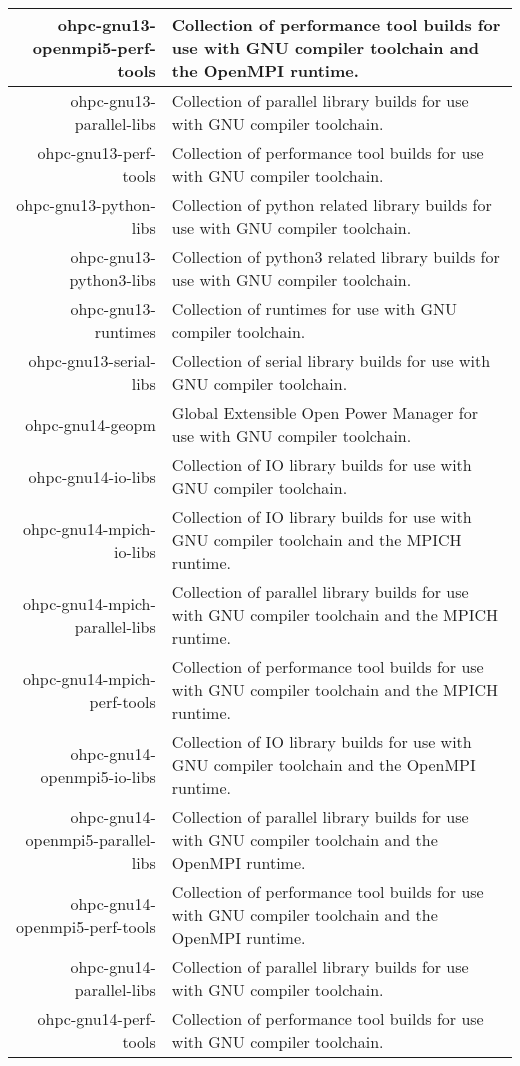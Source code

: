 \begin{tabularx}{\textwidth}{r|X}
\hline
ohpc-gnu13-openmpi5-perf-tools & Collection of performance tool builds for use with GNU compiler toolchain and the OpenMPI runtime. \\
\hline
ohpc-gnu13-parallel-libs & Collection of parallel library builds for use with GNU compiler toolchain. \\
\hline
ohpc-gnu13-perf-tools & Collection of performance tool builds for use with GNU compiler toolchain. \\
\hline
ohpc-gnu13-python-libs & Collection of python related library builds for use with GNU compiler toolchain. \\
\hline
ohpc-gnu13-python3-libs & Collection of python3 related library builds for use with GNU compiler toolchain. \\
\hline
ohpc-gnu13-runtimes & Collection of runtimes for use with GNU compiler toolchain. \\
\hline
ohpc-gnu13-serial-libs & Collection of serial library builds for use with GNU compiler toolchain. \\
\hline
ohpc-gnu14-geopm & Global Extensible Open Power Manager for use with GNU compiler toolchain. \\
\hline
ohpc-gnu14-io-libs & Collection of IO library builds for use with GNU compiler toolchain. \\
\hline
ohpc-gnu14-mpich-io-libs & Collection of IO library builds for use with GNU compiler toolchain and the MPICH runtime. \\
\hline
ohpc-gnu14-mpich-parallel-libs & Collection of parallel library builds for use with GNU compiler toolchain and the MPICH runtime. \\
\hline
ohpc-gnu14-mpich-perf-tools & Collection of performance tool builds for use with GNU compiler toolchain and the MPICH runtime. \\
\hline
ohpc-gnu14-openmpi5-io-libs & Collection of IO library builds for use with GNU compiler toolchain and the OpenMPI runtime. \\
\hline
ohpc-gnu14-openmpi5-parallel-libs & Collection of parallel library builds for use with GNU compiler toolchain and the OpenMPI runtime. \\
\hline
ohpc-gnu14-openmpi5-perf-tools & Collection of performance tool builds for use with GNU compiler toolchain and the OpenMPI runtime. \\
\hline
ohpc-gnu14-parallel-libs & Collection of parallel library builds for use with GNU compiler toolchain. \\
\hline
ohpc-gnu14-perf-tools & Collection of performance tool builds for use with GNU compiler toolchain. \\

\end{tabularx}
